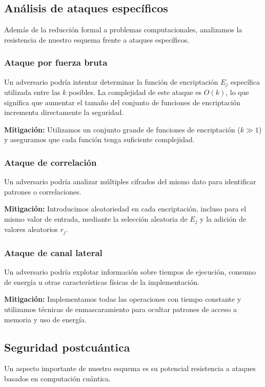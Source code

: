 \documentclass[11pt]{article}
\theoremstyle{plain}
\begin{document}
\subsection{Análisis de ataques específicos}

Además de la reducción formal a problemas computacionales, analizamos la resistencia de nuestro esquema frente a ataques específicos.

\subsubsection{Ataque por fuerza bruta}
Un adversario podría intentar determinar la función de encriptación $E_j$ específica utilizada entre las $k$ posibles. La complejidad de este ataque es $O(k)$, lo que significa que aumentar el tamaño del conjunto de funciones de encriptación incrementa directamente la seguridad.

\textbf{Mitigación:} Utilizamos un conjunto grande de funciones de encriptación ($k \gg 1$) y aseguramos que cada función tenga suficiente complejidad.

\subsubsection{Ataque de correlación}
Un adversario podría analizar múltiples cifrados del mismo dato para identificar patrones o correlaciones.

\textbf{Mitigación:} Introducimos aleatoriedad en cada encriptación, incluso para el mismo valor de entrada, mediante la selección aleatoria de $E_j$ y la adición de valores aleatorios $r_j$.

\subsubsection{Ataque de canal lateral}
Un adversario podría explotar información sobre tiempos de ejecución, consumo de energía u otras características físicas de la implementación.

\textbf{Mitigación:} Implementamos todas las operaciones con tiempo constante y utilizamos técnicas de enmascaramiento para ocultar patrones de acceso a memoria y uso de energía.

\subsection{Seguridad postcuántica}

Un aspecto importante de nuestro esquema es su potencial resistencia a ataques basados en computación cuántica.
\end{document}
